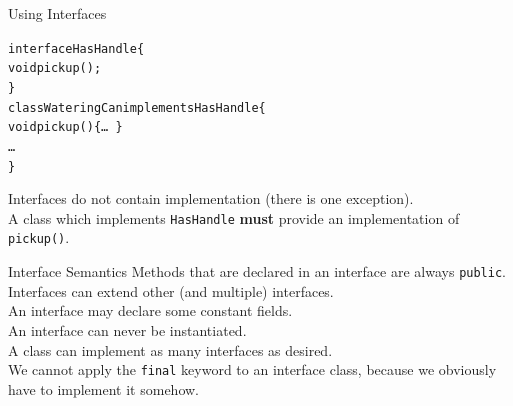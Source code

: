 \documentclass[aspectratio=169]{beamer}
\begin{document}
\begin{frame}{Using Interfaces}
\begin{alltt}
  interface HasHandle \{ \\
\qquad    void pickup(); \\
  \}\\[1em]
  class WateringCan \alert{implements} HasHandle \{ \\
\qquad    void pickup() \{ \ldots~\}  \\
\qquad    \ldots \\
  \}\\
\end{alltt}
\vspace{0.5em}
Interfaces do not contain implementation (there is one exception).\\
\vspace{1em}
A class which implements \texttt{HasHandle} \textbf{must} provide an implementation of \texttt{pickup()}.
\end{frame}



\begin{frame}{Interface Semantics}
Methods that are declared in an interface are always \texttt{public}. \\
\vspace{0.5em}
Interfaces can extend other (and multiple) interfaces. \\
\vspace{0.5em}
An interface may declare some constant fields. \\
\vspace{0.5em}
An interface can never be instantiated. \\
\vspace{0.5em}
A class can implement as many interfaces as desired. \\
\vspace{0.5em}
We cannot apply the \texttt{final} keyword to an interface class, because we obviously have to implement it somehow.
\end{frame}
\end{document}
